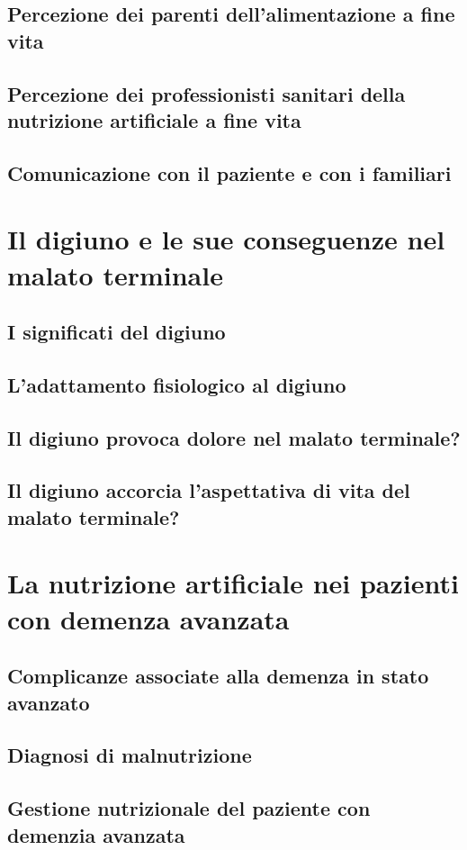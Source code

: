\documentclass[12pt,a4paper,oneside]{book}
\begin{document}
\section{Percezione dei parenti dell'alimentazione a fine vita}
\section{Percezione dei professionisti sanitari della nutrizione artificiale a fine vita}
\section{Comunicazione con il paziente e con i familiari }

\chapter{Il digiuno e le sue conseguenze nel malato terminale}
\section{I significati del digiuno}
\section{L'adattamento fisiologico al digiuno}
\section{Il digiuno provoca dolore nel malato terminale?}
\section{Il digiuno accorcia l'aspettativa di vita del malato terminale?}

\chapter{La nutrizione artificiale nei pazienti con demenza avanzata}
\section{Complicanze associate alla demenza in stato avanzato}
\section{Diagnosi di malnutrizione}
\section{Gestione nutrizionale del paziente con demenzia avanzata}
\end{document}
